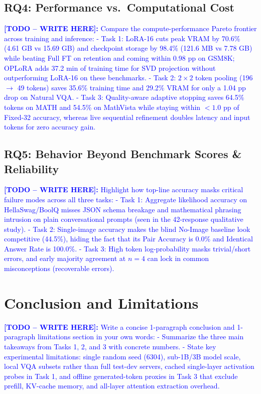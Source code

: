 \documentclass{article}
\newcommand{\writetodo}[1]{\noindent\textcolor{blue}{\textbf{[TODO -- WRITE HERE]:} #1}\par\medskip}
\begin{document}
\subsection{RQ4: Performance vs.\ Computational Cost}
\writetodo{Compare the compute-performance Pareto frontier across training and inference:
- Task 1: LoRA-16 cuts peak VRAM by 70.6\% (4.61 GB vs 15.69 GB) and checkpoint storage by 98.4\% (121.6 MB vs 7.78 GB) while beating Full FT on retention and coming within 0.98 pp on GSM8K; OPLoRA adds 37.2 min of training time for SVD projection without outperforming LoRA-16 on these benchmarks.
- Task 2: $2\times 2$ token pooling (196 $\rightarrow$ 49 tokens) saves 35.6\% training time and 29.2\% VRAM for only a 1.04 pp drop on Natural VQA.
- Task 3: Quality-aware adaptive stopping saves 64.5\% tokens on MATH and 54.5\% on MathVista while staying within $<1.0$ pp of Fixed-32 accuracy, whereas live sequential refinement doubles latency and input tokens for zero accuracy gain.}

\subsection{RQ5: Behavior Beyond Benchmark Scores \& Reliability}
\writetodo{Highlight how top-line accuracy masks critical failure modes across all three tasks:
- Task 1: Aggregate likelihood accuracy on HellaSwag/BoolQ misses JSON schema breakage and mathematical phrasing intrusion on plain conversational prompts (seen in the 42-response qualitative study).
- Task 2: Single-image accuracy makes the blind No-Image baseline look competitive (44.5\%), hiding the fact that its Pair Accuracy is 0.0\% and Identical Answer Rate is 100.0\%.
- Task 3: High token log-probability masks trivial/short errors, and early majority agreement at $n=4$ can lock in common misconceptions (recoverable errors).}

\section{Conclusion and Limitations}
\label{sec:conclusion}
\writetodo{Write a concise 1-paragraph conclusion and 1-paragraph limitations section in your own words:
- Summarize the three main takeaways from Tasks 1, 2, and 3 with concrete numbers.
- State key experimental limitations: single random seed (6304), sub-1B/3B model scale, local VQA subsets rather than full test-dev servers, cached single-layer activation probes in Task 1, and offline generated-token proxies in Task 3 that exclude prefill, KV-cache memory, and all-layer attention extraction overhead.}
\end{document}
